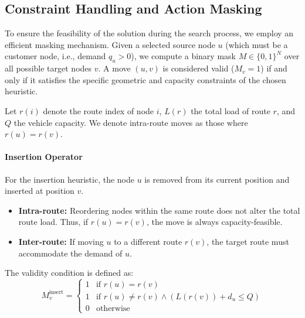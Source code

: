 \documentclass[letterpaper]{article} %
\begin{document}
\subsection{Constraint Handling and Action Masking}
To ensure the feasibility of the solution during the search process, we employ an efficient masking mechanism. Given a selected source node $u$ (which must be a customer node, i.e., demand $q_u > 0$), we compute a binary mask $M \in \{0, 1\}^N$ over all possible target nodes $v$. A move $(u, v)$ is considered valid ($M_v = 1$) if and only if it satisfies the specific geometric and capacity constraints of the chosen heuristic.

Let $r(i)$ denote the route index of node $i$, $L(r)$ the total load of route $r$, and $Q$ the vehicle capacity. We denote intra-route moves as those where $r(u) = r(v)$.

\paragraph{Insertion Operator}
For the insertion heuristic, the node $u$ is removed from its current position and inserted at position $v$.
\begin{itemize}
    \item \textbf{Intra-route:} Reordering nodes within the same route does not alter the total route load. Thus, if $r(u) = r(v)$, the move is always capacity-feasible.
    \item \textbf{Inter-route:} If moving $u$ to a different route $r(v)$, the target route must accommodate the demand of $u$.
\end{itemize}
The validity condition is defined as:
\begin{equation}
    M_v^{\text{insert}} =
    \begin{cases}
        1 & \text{if } r(u) = r(v) \\
        1 & \text{if } r(u) \neq r(v) \land (L(r(v)) + d_u \leq Q) \\
        0 & \text{otherwise}
    \end{cases}
\end{equation}
\end{document}
